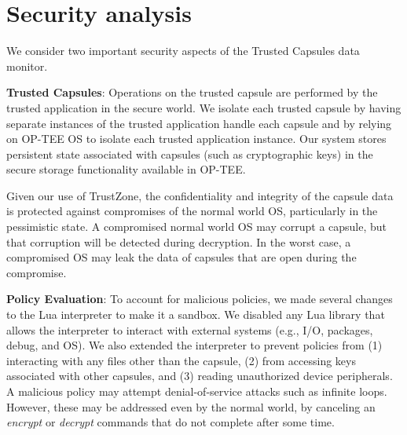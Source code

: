 
\section{Security analysis}

We consider two important security aspects of the Trusted Capsules data monitor.

\textbf{Trusted Capsules}: Operations on the trusted capsule are performed by
the trusted application in the secure world. We isolate each trusted capsule by
having separate instances of the trusted application handle each capsule and
by relying on OP-TEE OS to isolate each trusted application instance.
Our system stores persistent state associated with capsules (such as cryptographic keys)
in the secure storage functionality available in OP-TEE.

Given our use of TrustZone, the confidentiality and integrity of the capsule
data is protected against compromises of the normal world OS, particularly in
the pessimistic state. A compromised normal world OS may corrupt a capsule, but
that corruption will be detected during decryption. In the worst case, a compromised OS
may leak the data of capsules that are open during the compromise.

\textbf{Policy Evaluation}: To account for malicious policies, we made several
changes to the Lua interpreter to make it a sandbox. We disabled any Lua library
that allows the interpreter to interact with external systems (e.g., I/O,
packages, debug, and OS). We also extended the interpreter to prevent policies
from (1) interacting with any files other than the capsule, (2) from accessing
keys associated with other capsules, and (3) reading unauthorized device
peripherals. A malicious policy may attempt denial-of-service attacks such as
infinite loops. However, these may be addressed even by the normal world, by
canceling an {\em encrypt} or {\em decrypt} commands that do not complete after
some time.